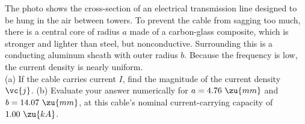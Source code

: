 The photo shows the cross-section of an electrical transmission line designed to be hung
in the air between towers. To prevent the cable from sagging too much, there is a central
core of radius $a$ made of a carbon-glass composite, which is stronger and lighter than steel, but
nonconductive. Surrounding this is a conducting aluminum sheath with outer radius $b$. Because the
frequency is low, the current density is nearly uniform.\\
(a) If the cable carries current $I$, find the magnitude of the current density $\vc{j}$.\answercheck\hwendpart
(b) Evaluate your answer numerically for $a=4.76\ \zu{mm}$ and $b=14.07\ \zu{mm}$, at this cable's
nominal current-carrying capacity of $1.00\ \zu{kA}$.\answercheck\hwendpart


